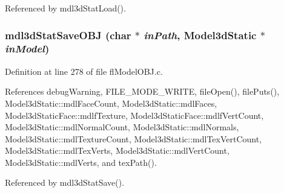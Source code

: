 Referenced by mdl3d\-Stat\-Load().
\subsubsection{ mdl3d\-Stat\-Save\-OBJ (char $\ast$ {\em in\-Path}, {\bf Model3d\-Static} $\ast$ {\em in\-Model})}\label{flModelOBJ_8h_66f3001e424356a60083f21c3d39f4c1}




Definition at line 278 of file fl\-Model\-OBJ.c.

References debug\-Warning, FILE\_\-MODE\_\-WRITE, file\-Open(), file\-Puts(), Model3d\-Static::mdl\-Face\-Count, Model3d\-Static::mdl\-Faces, Model3d\-Static\-Face::mdlf\-Texture, Model3d\-Static\-Face::mdlf\-Vert\-Count, Model3d\-Static::mdl\-Normal\-Count, Model3d\-Static::mdl\-Normals, Model3d\-Static::mdl\-Texture\-Count, Model3d\-Static::mdl\-Tex\-Vert\-Count, Model3d\-Static::mdl\-Tex\-Verts, Model3d\-Static::mdl\-Vert\-Count, Model3d\-Static::mdl\-Verts, and tex\-Path().

Referenced by mdl3d\-Stat\-Save().